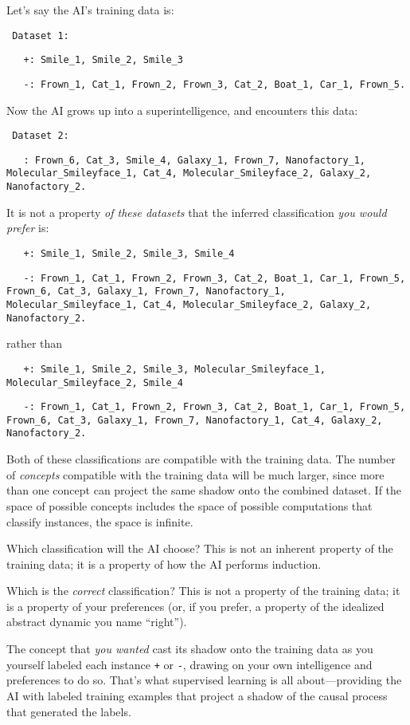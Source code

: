 {
 Let's say the AI's training data
is:}


\texttt{
 Dataset 1:}

\texttt{
\ \  +: Smile\_1, Smile\_2, Smile\_3}

\texttt{
\ \  -: Frown\_1, Cat\_1, Frown\_2, Frown\_3, Cat\_2, Boat\_1,
Car\_1, Frown\_5.}

{
 Now the AI grows up into a superintelligence, and encounters this
data:}

\texttt{
 Dataset 2:}

\texttt{
\ \  : Frown\_6, Cat\_3, Smile\_4, Galaxy\_1, Frown\_7, Nanofactory\_1,
Molecular\_Smileyface\_1, Cat\_4, Molecular\_Smileyface\_2, Galaxy\_2,
Nanofactory\_2.}

{
 It is not a property \textit{of these datasets} that the inferred
classification \textit{you would prefer} is:}

\texttt{
\ \  +: Smile\_1, Smile\_2, Smile\_3, Smile\_4}

\texttt{
\ \ -: Frown\_1, Cat\_1, Frown\_2, Frown\_3, Cat\_2, Boat\_1,
Car\_1, Frown\_5, Frown\_6, Cat\_3, Galaxy\_1, Frown\_7,
Nanofactory\_1, Molecular\_Smileyface\_1, Cat\_4,
Molecular\_Smileyface\_2, Galaxy\_2, Nanofactory\_2.}

{
 rather than}

\texttt{
\ \  +: Smile\_1, Smile\_2, Smile\_3, Molecular\_Smileyface\_1,
Molecular\_Smileyface\_2, Smile\_4}

\texttt{
\ \ -: Frown\_1, Cat\_1, Frown\_2, Frown\_3, Cat\_2, Boat\_1,
Car\_1, Frown\_5, Frown\_6, Cat\_3, Galaxy\_1, Frown\_7,
Nanofactory\_1, Cat\_4, Galaxy\_2, Nanofactory\_2.}

{
 Both of these classifications are compatible with the training
data. The number of \textit{concepts} compatible with the training data
will be much larger, since more than one concept can project the same
shadow onto the combined dataset. If the space of possible concepts
includes the space of possible computations that classify instances,
the space is infinite.}

{
 Which classification will the AI choose? This is not an inherent
property of the training data; it is a property of how the AI performs
induction.}

{
 Which is the \textit{correct} classification? This is not a
property of the training data; it is a property of your preferences
(or, if you prefer, a property of the idealized abstract dynamic you
name ``right'').}

{
 The concept that \textit{you wanted} cast its shadow onto the
training data as you yourself labeled each instance \texttt{+} or \texttt{-}, drawing on
your own intelligence and preferences to do so. That's
what supervised learning is all about---providing the AI with labeled
training examples that project a shadow of the causal process that
generated the labels.}

